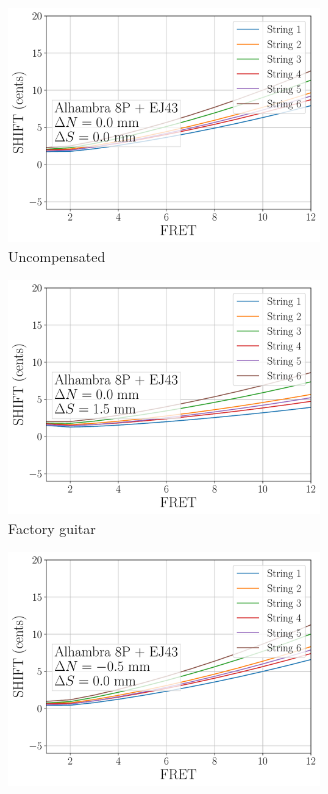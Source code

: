  \begin{figure}
  \centering
  \begin{subfigure}[b]{0.45\textwidth}
   \centering
   \includegraphics[width=3.25in]{figures/shift_uncompensated}
   \caption{Uncompensated}
   \label{fig:shift_uncompensated}
  \end{subfigure}
  \hspace{0.25in}
  \begin{subfigure}[b]{0.45\textwidth}
   \centering
   \includegraphics[width=3.25in]{figures/shift_factory}
   \caption{Factory guitar}
   \label{fig:shift_factory}
  \end{subfigure}
  \par\vspace{0.25in}
  \begin{subfigure}[b]{0.45\textwidth}
   \centering
   \includegraphics[width=3.25in]{figures/shift_compensated_1}

\end{subfigure}
\end{figure}
